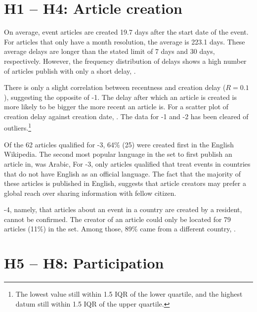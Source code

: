 
\section{H1 -- H4: Article creation}

On average, event articles are created 19.7 days after the start date of the event.
For articles that only have a month resolution, the average  is 223.1 days.
These average delays are longer than the stated limit of 7 days and 30 days, respectively.
However, the frequency distribution of delays shows a high number of articles publish with only a short delay, . 


There is only a slight correlation between recentness and creation delay ($R = 0.1$), suggesting the opposite of \hyp{1}.
 The delay after which an article is created is more likely to be bigger the more recent an article is.
For a scatter plot of  creation delay against creation date, .
The data for \hyp{1} and \hyp{2} has been cleared of outliers.\footnote{The lowest value still within 1.5 \ac{IQR} of the lower quartile, and the highest datum still within 1.5 \ac{IQR} of the upper quartile.}


Of the 62 articles qualified for \hyp{3}, 64\% (25) were created first in the English Wikipedia.  
The second most popular language in the set to first publish an article in, was Arabic, 
For \hyp{3}, only articles qualified that treat events in countries that do not have English as an official language. 
The fact that the majority of these articles is published in English, suggests that article creators may prefer a global reach over sharing information with fellow citizen.


\hyp{4}, namely, that articles about an event in a country are created by a resident, cannot be confirmed. 
The creator of an article could only be located for 79 articles (11\%) in the set. 
Among those, 89\% came from a different country, .


\section{H5 -- H8: Participation}\label{sec:h5h8}

